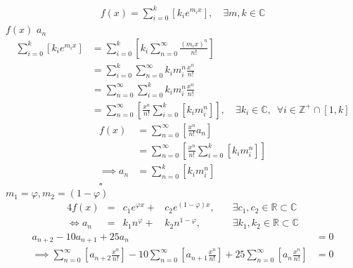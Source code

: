 \documentclass{article}
\begin{document}
\begin{align}
    f{\left({ x }\right)} = \sum^{k}_{i= 0}   {\left[{ k_i e^{m_i x} }\right]}, \quad \exists m,k \in \mathbb{C} \nonumber
\end{align}
$f{\left({ x }\right)}$
$a_n$
\begin{align}
    \sum^{k}_{i= 0}   {\left[{ k_i e^{m_i x}  }\right]}  &= \sum^{k}_{i= 0}   {\left[{ k_i \sum^{\infty}_{n= 0}   \frac{{\left({ m_i x }\right)}^n}{n!}  }\right]}  \nonumber \\
							 &= \sum^{k}_{i= 0}  \sum^{\infty}_{n= 0}   k_i m_i^n \frac{x^n}{n!} \nonumber\\
							 &=    \sum^{\infty}_{n= 0} \sum^{k}_{i= 0}   k_i m_i^n \frac{x^n}{n!} \nonumber \\
							 &= \sum^{\infty}_{n= 0} {\left[{ \frac{x^n}{n!}  \sum^{k}_{i=0}   {\left[{ k_im^n_i }\right]}  }\right]}, \quad \exists k_i \in \mathbb{C}, \enspace \forall i \in \mathbb{Z}^+\cap {\left[{ 1, k }\right]}     \label{eq:unique-root-sol-power-series-form}
\end{align}
\begin{align}
    f{\left({ x }\right)} &= \sum^{\infty}_{n= 0}   {\left[{  \frac{x^n}{n!} a_n }\right]} \nonumber \\
&= \sum^{\infty}_{n= 0} {\left[{ \frac{x^n}{n!}  \sum^{k}_{i=0}   {\left[{ k_im^n_i }\right]}  }\right]}  \nonumber \\
      \implies  a_n &= \sum^{k}_{n= 0} {\left[{ k_im_i^n }\right]}     \nonumber \\ \nonumber
\square
\end{align}
$m_1 = \varphi, m_2 = {\left({ 1-\varphi }\right)}$
\begin{alignat}{4}
    f{\left({ x }\right)} &= &c_1 e^{\varphi x} +  &c_2 e^{{\left({ 1-\varphi }\right)} x}, \quad &\exists c_1, c_2 \in \mathbb{R} \subset \mathbb{C} \nonumber \\
    \iff  a_n &= &k_1 n^{\varphi} +  &k_2 n^{1- \varphi}, &\exists k_1, k_2 \in \mathbb{R} \subset \mathbb{C} \nonumber
\end{alignat}
\begin{align}
    a_{n+2} -  10a_{n+ 1} +  25a_{n}&= 0 \label{eq:hom-repeated-roots-recurrence} \\
    \implies  \sum^{\infty}_{n= 0}   {\left[{ a_{n+2} \frac{x^n}{n!} }\right]} - 10 \sum^{\infty}_{n= 0}   {\left[{ a_{n+1} \frac{x^n}{n!}    }\right]} + 25 \sum^{\infty}_{n= 0 }   {\left[{  a_{n}\frac{x^n}{n!} }\right]}&= 0 \nonumber
\end{align}
\end{document}
